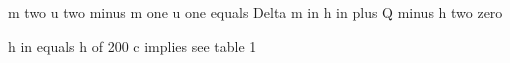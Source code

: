 m two u two minus m one u one equals Delta m in h in plus Q minus h two zero

h in equals h of 200 c implies see table 1